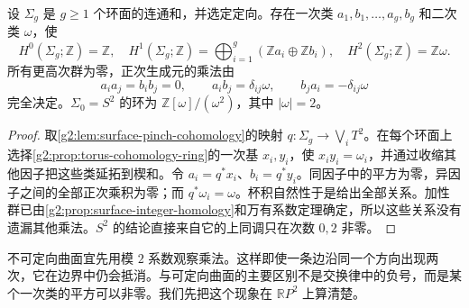 \begin{theorem}\label{g2:thm:orientable-surface-ring}
	设 \(\Sigma_g\) 是 \(g\geq1\) 个环面的连通和，并选定定向。存在一次类 \(a_1,b_1,\ldots,a_g,b_g\) 和二次类 \(\omega\)，使
	\[
		H^0(\Sigma_g;\mathbb Z)=\mathbb Z,
		\quad H^1(\Sigma_g;\mathbb Z)=\bigoplus_{i=1}^g(\mathbb Za_i\oplus\mathbb Zb_i),
		\quad H^2(\Sigma_g;\mathbb Z)=\mathbb Z\omega.
	\]
	所有更高次群为零，正次生成元的乘法由
	\begin{equation}\label{g2:eq:orientable-surface-products}
		a_i a_j=b_i b_j=0,\qquad a_i b_j=\delta_{ij}\omega,\qquad b_j a_i=-\delta_{ij}\omega
	\end{equation}
	完全决定。\(\Sigma_0=S^2\) 的环为 \(\mathbb Z[\omega]/(\omega^2)\)，其中 \(|\omega|=2\)。
\end{theorem}
\begin{proof}
	取\cref{g2:lem:surface-pinch-cohomology}的映射 \(q:\Sigma_g\to\bigvee_iT^2\)。在每个环面上选择\cref{g2:prop:torus-cohomology-ring}的一次基 \(x_i,y_i\)，使 \(x_i y_i=\omega_i\)，并通过收缩其他因子把这些类延拓到楔和。令 \(a_i=q^*x_i\)、\(b_i=q^*y_i\)。同因子中的平方为零，异因子之间的全部正次乘积为零；而 \(q^*\omega_i=\omega\)。杯积自然性于是给出全部关系。加性群已由\cref{g2:prop:surface-integer-homology}和万有系数定理确定，所以这些关系没有遗漏其他乘法。\(S^2\) 的结论直接来自它的上同调只在次数 \(0,2\) 非零。
\end{proof}

不可定向曲面宜先用模 \(2\) 系数观察乘法。这样即使一条边沿同一个方向出现两次，它在边界中仍会抵消。与可定向曲面的主要区别不是交换律中的负号，而是某个一次类的平方可以非零。我们先把这个现象在 \(\mathbb RP^2\) 上算清楚。

